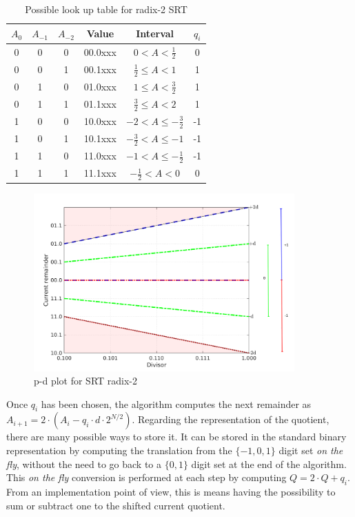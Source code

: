 \begin{table}
  \begin{center}
    \caption{Possible look up table for radix-2 SRT}
    \label{tab:srt_radix2}
    \begin{tabular}{|c|c|c|c|c|c|} 
        \hline
        \textbf{$A_0$} & \textbf{$A_{-1}$} & \textbf{$A_{-2}$} & \textbf{Value} & \textbf{Interval} & $q_i$ \\
        \hline\hline
        0 & 0 & 0 & 00.0xxx & $0 < A < \frac{1}{2} $ & 0 \\
        0 & 0 & 1 & 00.1xxx & $\frac{1}{2} \leq A  < 1$ & 1 \\
        0 & 1 & 0 & 01.0xxx & $1 \leq A < \frac{3}{2}$ & 1 \\
        0 & 1 & 1 & 01.1xxx & $\frac{3}{2} \leq A < 2 $ & 1 \\
        1 & 0 & 0 & 10.0xxx & $-2 < A \leq -\frac{3}{2} $ & -1 \\
        1 & 0 & 1 & 10.1xxx & $-\frac{3}{2} < A \leq -1 $ & -1 \\
        1 & 1 & 0 & 11.0xxx & $-1 < A \leq -\frac{1}{2} $ & -1 \\
        1 & 1 & 1 & 11.1xxx & $-\frac{1}{2} < A < 0 $ & 0 \\
        \hline
    \end{tabular}
  \end{center}
\end{table}

\begin{figure}
    \centering
    \includegraphics[width=100mm]{images/pd_plot_r2.png}
    \caption{p-d plot for SRT radix-2}
    \label{fig:pd_radix_2}
\end{figure}

Once $q_i$ has been chosen, the algorithm computes the next remainder as $A_{i+1} = 2\cdot (A_i - q_i\cdot d \cdot 2^{N/2})$. 
Regarding the representation of the quotient, there are many possible ways to store it.
It can be stored in the standard binary representation by computing the translation from the $\{-1, 0, 1\}$ digit set \textit{on the fly}, without the need to go back to a $\{0, 1\}$ digit set at the end of the algorithm. 
This \textit{on the fly} conversion is performed at each step by computing $Q = 2\cdot Q + q_i$. 
From an implementation point of view, this is means having the possibility to sum or subtract one to the shifted current quotient.

